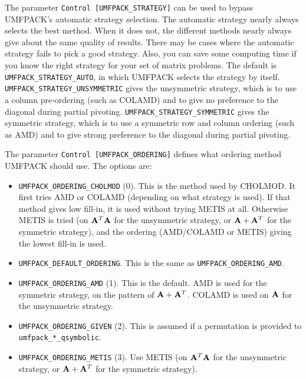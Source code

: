 \documentclass[11pt]{article}
\newcommand{\m}[1]{{\bf{#1}}}       %
\begin{document}
\begin{itemize}
    The parameter {\tt Control [UMFPACK\_STRATEGY]} can be used to bypass
    UMFPACK's automatic strategy selection.  The automatic strategy nearly
    always selects the best method.  When it does not, the different methods
    nearly always give about the same quality of results.  There may be
    cases where the automatic strategy fails to pick a good strategy. Also,
    you can save some computing time if you know the right strategy for your
    set of matrix problems.  The default is \verb'UMFPACK_STRATEGY_AUTO',
    in which UMFPACK selects the strategy by itself.
    \verb'UMFPACK_STRATEGY_UNSYMMETRIC' gives the unsymmetric
    strategy, which is to use a column pre-ordering (such as COLAMD)
    and to give no preference to the diagonal during partial pivoting.
    \verb'UMFPACK_STRATEGY_SYMMETRIC' gives the symmetric strategy,
    which is to use a symmetric row and column ordering (such as AMD)
    and to give strong preference to the diagonal during partial pivoting.

    The parameter {\tt Control [UMFPACK\_ORDERING]} defines what ordering
    method UMFPACK should use.  The options are:

    \begin{itemize}
    \item \verb'UMFPACK_ORDERING_CHOLMOD' (0).
        This is the method used by CHOLMOD.  It first tries AMD or COLAMD
        (depending on what strategy is used).  If that method gives low
        fill-in, it is used without trying METIS at all.
        Otherwise METIS is tried (on $\m{A}^T\m{A}$ for the unsymmetric
        strategy, or $\m{A}+\m{A}^T$ for the symmetric strategy),
        and the ordering (AMD/COLAMD or METIS) giving the lowest fill-in is
        used.

    \item \verb'UMFPACK_DEFAULT_ORDERING'.  This is the same as
    \verb'UMFPACK_ORDERING_AMD'.

    \item \verb'UMFPACK_ORDERING_AMD' (1).  This is the default.
        AMD is used for the symmetric strategy, on the pattern of
        $\m{A}+\m{A}^T$.  COLAMD is used on $\m{A}$ for the unsymmetric
        strategy.

    \item \verb'UMFPACK_ORDERING_GIVEN' (2).  This is assumed if
        a permutation is provided to \newline
        {\tt umfpack\_*\_qsymbolic}.

    \item \verb'UMFPACK_ORDERING_METIS' (3).
        Use METIS (on $\m{A}^T\m{A}$ for the unsymmetric
        strategy, or $\m{A}+\m{A}^T$ for the symmetric strategy).


\end{itemize}
\end{itemize}
\end{document}
